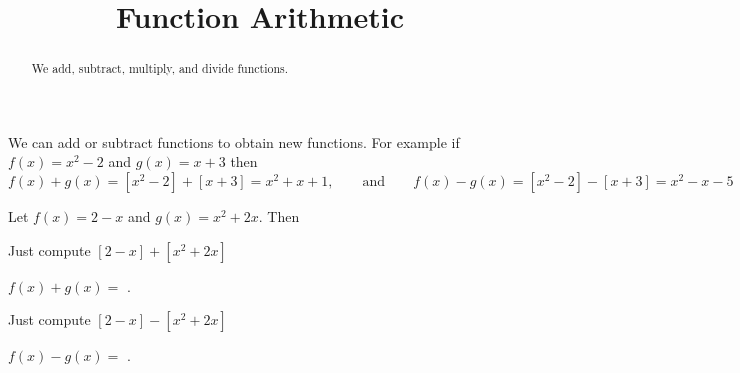 \documentclass{ximera}
\title{Function Arithmetic}
\begin{document}
\begin{abstract}
We add, subtract, multiply, and divide functions.
\end{abstract}
\maketitle


We can add or subtract functions to obtain new functions. For example if $f(x)=x^2-2$ and $g(x)=x+3$ then 
\[
f(x)+g(x)=[x^2-2]+[x+3]=x^2+x+1,\qquad\text{and}\qquad f(x)-g(x)=[x^2-2]-[x+3]=x^2-x-5
\]

\begin{question}
Let $f(x)=2-x$ and $g(x)=x^2+2x$. Then

\begin{hint}
Just compute $[2-x]+[x^2+2x]$
\end{hint}
\begin{prompt}
$f(x)+g(x)=$ .
\end{prompt}

\begin{hint}
Just compute $[2-x]-[x^2+2x]$
\end{hint}
\begin{prompt}
$f(x)-g(x)=$ .
\end{prompt}

\end{question}
\end{document}

